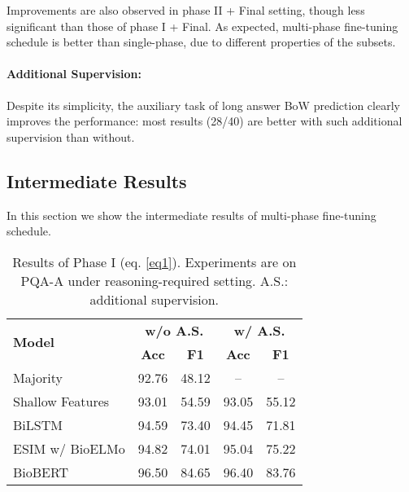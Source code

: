 \documentclass[11pt,a4paper]{article}
\begin{document}
Improvements are also observed in phase II + Final setting, though less significant than those of phase I + Final. As expected, multi-phase fine-tuning schedule is better than single-phase, due to different properties of the subsets.

\paragraph{Additional Supervision:} Despite its simplicity, the auxiliary task of long answer BoW prediction clearly improves the performance: most results (28/40) are better with such additional supervision than without.


\subsection{Intermediate Results}
In this section we show the intermediate results of multi-phase fine-tuning schedule.

\begin{table}
    \small
    \centering
    \begin{tabular}{lcccc}
        \toprule
        \multirow{2}{*}{\textbf{Model}} & 
        \multicolumn{2}{c}{\textbf{w/o A.S.}} &
        \multicolumn{2}{c}{\textbf{w/ A.S.}} \\
        \cmidrule{2-5}
        & \textbf{Acc} & \textbf{F1} & \textbf{Acc} & \textbf{F1} \\
        \midrule
        Majority & 92.76 & 48.12 & -- & -- \\
        \midrule
        Shallow Features & 93.01 & 54.59 & 93.05 & 55.12  \\
        BiLSTM & 94.59 & 73.40 & 94.45 & 71.81 \\
        ESIM w/ BioELMo & 94.82 & 74.01 & 95.04 & 75.22 \\
        BioBERT & 96.50 & 84.65 & 96.40 & 83.76\\
        \bottomrule
    \end{tabular}
    \vskip -0.15cm
    \caption{Results of Phase I (eq. \ref{eq1}). Experiments are on PQA-A under reasoning-required setting. A.S.: additional supervision.} 
    \label{tab:phasei}
\end{table}
\end{document}
